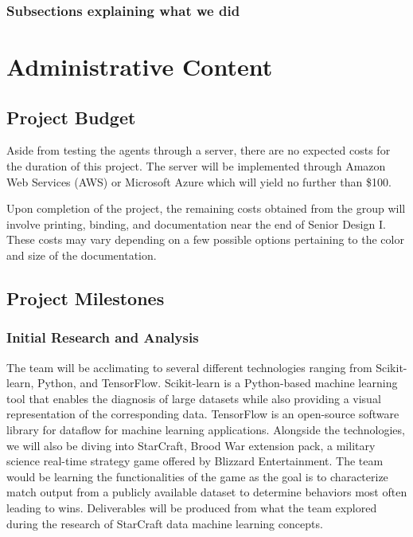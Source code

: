 \documentclass[a4paper,12pt]{report}
\begin{document}
\subsection{Subsections explaining what we did}

\chapter{Administrative Content}
\section{Project Budget}

Aside from testing the agents through a server, there are no expected costs for the duration of this project. The server will be implemented through Amazon Web Services (AWS) or Microsoft Azure which will yield no further than \$100.

Upon completion of the project, the remaining costs obtained from the group will involve printing, binding, and documentation near the end of Senior Design I. These costs may vary depending on a few possible options pertaining to the color and size of the documentation.

\section{Project Milestones}

\subsection{Initial Research and Analysis}

The team will be acclimating to several different technologies ranging from Scikit-learn, Python, and TensorFlow. Scikit-learn is a Python-based machine learning tool that enables the diagnosis of large datasets while also providing a visual representation of the corresponding data. TensorFlow is an open-source software library for dataflow for machine learning applications. Alongside the technologies, we will also be diving into StarCraft, Brood War extension pack, a military science real-time strategy game offered by Blizzard Entertainment. The team would be learning the functionalities of the game as the goal is to characterize match output from a publicly available dataset to determine behaviors most often leading to wins. Deliverables will be produced from what the team explored during the research of StarCraft data machine learning concepts.
\end{document}

